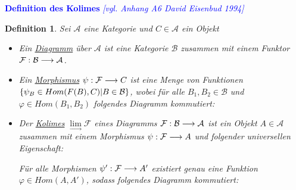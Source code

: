 \documentclass[10pt,a4paper]{report}
\newcommand{\comment}[1]{}
\newcommand{\ModulsOfDifferenzials}{David Eisenbud 1994}
\newcounter{Aussage}[chapter]
\newtheorem{definition}[Aussage]{Definition}
\newcommand{\functionfront}[3]{\nolinebreak{#1:#2 \longrightarrow #3}}
\newcommand{\colimes}[0]{\lim\limits_{ \longrightarrow }}
\begin{document}
\textcolor{blue}{\textbf{Definition des Kolimes} \textit{[vgl. Anhang A6 \ModulsOfDifferenzials]}}
\begin{definition}\comment{\label{Definition des Kolimes}}
Sei $\mathcal{A}$ eine Kategorie und $C \in \mathcal{A}$ ein Objekt
\begin{itemize}
\item Ein \underline{Diagramm} über $\mathcal{A}$ ist eine Kategorie $\mathcal{B}$ zusammen mit einem Funktor $\functionfront{\mathcal{F}}{\mathcal{B}}{\mathcal{A}}$.
\item Ein \underline{Morphismus} $\functionfront{\psi}{\mathcal{F}}{C}$ ist eine Menge von Funktionen 
$\nolinebreak{\lbrace \psi_B \in Hom(F(B),C) \vert B \in \mathcal{B} \rbrace}$, wobei für alle $B_1,B_2 \in \mathcal{B}$ und $\varphi \in Hom(B_1,B_2)$ folgendes Diagramm kommutiert:
\begin{center}
\end{center}
\item Der \underline{Kolimes} $\colimes \mathcal{F}$ eines Diagramms $\functionfront{\mathcal{F}}{\mathcal{B}}{\mathcal{A}}$ ist ein Objekt $A \in \mathcal{A}$ zusammen mit einem Morphismus $\functionfront{\psi}{\mathcal{F}}{A}$ und folgender universellen Eigenschaft:
\begin{center}
\comment{$\forall Morphismen \functionfront{\psi '}{\mathcal{F}}{\mathcal{A}'}\exists ! \varphi \in Hom_{\mathcal{A}}(A,A') \forall B \in \mathcal{B}: \varphi \circ \psi_B = \psi'_B $}

Für alle Morphismen $\functionfront{\psi '}{\mathcal{F}}{A'}$ existiert genau eine Funktion $\varphi \in Hom(A,A')$, sodass folgendes Diagramm kommutiert:
\end{center}
\end{itemize}
\end{definition}
\end{document}
